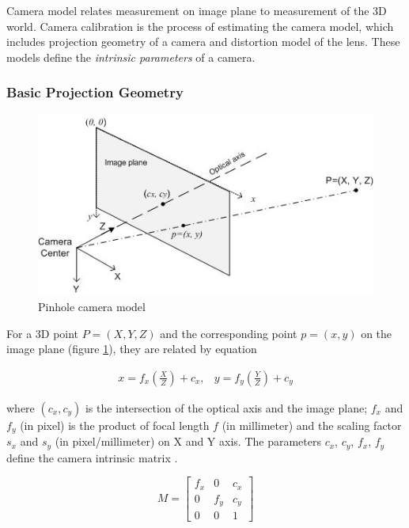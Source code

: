 Camera model relates measurement on image plane to measurement of the
3D world. Camera calibration is the process of estimating the camera
model, which includes projection geometry of a camera and distortion
model of the lens. These models define the \textit{intrinsic
  parameters} of a camera.

\subsubsection{Basic Projection Geometry}
\begin{figure}[h]
\centering
\includegraphics[width=12cm, keepaspectratio=true]{./Figures/camera_model.jpg}
\caption{Pinhole camera model}
\label{figch2:cammodel}
\end{figure}

For a 3D point $P=(X, Y, Z)$ and the corresponding point
$p=(x, y)$ on the image plane (figure
\ref{figch2:cammodel}), they are related by equation
\cite{bradski_learning_2008}

\begin{equation}
\begin{matrix}
x = f_x\left(\frac{X}{Z}\right)+c_x, &
y=f_y\left(\frac{Y}{Z}\right)+c_y
\end{matrix}
\end{equation}

\noindent where $(c_x, c_y)$ is the
intersection of the optical axis and the image plane; $f_x$ and $f_y$
(in pixel) is the product of focal length $f$ (in millimeter) and the
scaling factor $s_x$ and $s_y$ (in pixel/millimeter) on X and Y axis.
The parameters $c_x$, $c_y$, $f_x$, $f_y$ define the camera intrinsic
matrix \cite{bradski_learning_2008} \cite{heikkila_four-step_1997}.

\begin{equation}
M = \begin{bmatrix}
f_x & 0 & c_x \\
0& f_y & c_y \\
0 & 0 & 1 \end{bmatrix}
\end{equation}

